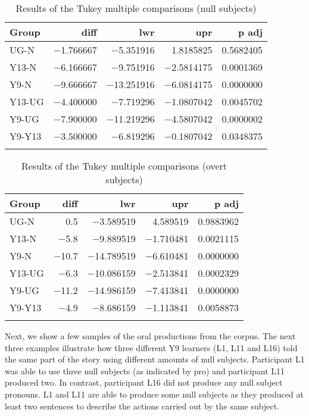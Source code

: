 \documentclass[output=paper]{langscibook}
\begin{document}
\begin{table}[H]
\caption{\label{tab:dominguez:8}Results of the Tukey multiple comparisons (null subjects)}
\begin{tabular}{lrrrr}
\lsptoprule
Group & diff & lwr & upr & p adj\\
\midrule
UG-N & −1.766667 & −5.351916 & 1.8185825 & 0.5682405\\
Y13-N & −6.166667 & −9.751916 & −2.5814175 & 0.0001369\\
Y9-N & −9.666667 & −13.251916 & −6.0814175 & 0.0000000\\
Y13-UG & −4.400000 & −7.719296 & −1.0807042 & 0.0045702\\
Y9-UG & −7.900000 & −11.219296 & −4.5807042 & 0.0000002\\
Y9-Y13 & −3.500000 & −6.819296 & −0.1807042 & 0.0348375\\
\lspbottomrule
\end{tabular}
\end{table}

\begin{table}[H]
\caption{\label{tab:dominguez:9}Results of the Tukey multiple comparisons (overt subjects)}
\begin{tabular}{lrrrr}
\lsptoprule
Group & diff & lwr & upr & p adj\\
\midrule
UG-N & 0.5 & −3.589519 & 4.589519 & 0.9883962\\
Y13-N & −5.8 & −9.889519 & −1.710481 & 0.0021115\\
Y9-N & −10.7 & −14.789519 & −6.610481 & 0.0000000\\
Y13-UG & −6.3 & −10.086159 & −2.513841 & 0.0002329\\
Y9-UG & −11.2 & −14.986159 & −7.413841 & 0.0000000\\
Y9-Y13 & −4.9 & −8.686159 & −1.113841 & 0.0058873\\
\lspbottomrule
\end{tabular}
\end{table}\clearpage

Next, we show a few samples of the oral productions from the corpus. The next three examples illustrate how three different Y9 learners (L1, L11 and L16) told the same part of the story using different amounts of null subjects. Participant L1 was able to use three null subjects (as indicated by pro) and participant L11 produced two. In contrast, participant L16 did not produce any null subject pronouns. L1 and L11 are able to produce some null subjects as they produced at least two sentences to describe the actions carried out by the same subject.
\end{document}
